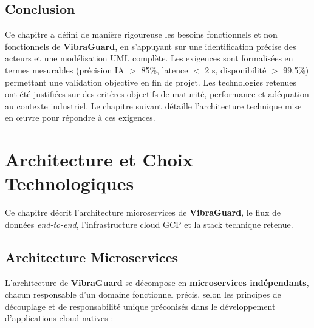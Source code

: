 \documentclass[12pt, a4paper, oneside]{report}
\newcommand{\projectname}{\textbf{VibraGuard}}
\begin{document}
\section{Conclusion}

Ce chapitre a défini de manière rigoureuse les besoins fonctionnels et non fonctionnels de
\projectname{}, en s'appuyant sur une identification précise des acteurs et une modélisation
UML complète. Les exigences sont formalisées en termes mesurables (précision IA $>$ 85\%,
latence $<$ 2 s, disponibilité $>$ 99,5\%) permettant une validation objective en fin de
projet. Les technologies retenues ont été justifiées sur des critères objectifs de maturité,
performance et adéquation au contexte industriel. Le chapitre suivant détaille l'architecture
technique mise en œuvre pour répondre à ces exigences.

\chapter{Architecture et Choix Technologiques}

Ce chapitre décrit l'architecture microservices de \projectname{}, le flux de données \textit{end-to-end}, l'infrastructure cloud GCP et la stack technique retenue.

\section{Architecture Microservices}

L'architecture de \projectname{} se décompose en \textbf{microservices indépendants},
chacun responsable d'un domaine fonctionnel précis, selon les principes de découplage
et de responsabilité unique préconisés dans le développement d'applications cloud-natives
\cite{springboot, kubernetes} :
\end{document}

